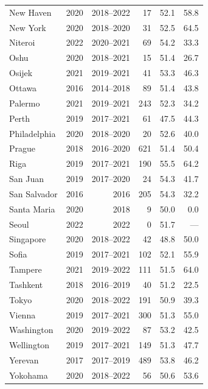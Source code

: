 \begin{longtable}{@{}lrrrrr@{}}
New Haven & 2020 & 2018–2022 & 17 & 52.1 & 58.8 \\
New York & 2020 & 2018–2020 & 31 & 52.5 & 64.5 \\
Niteroi & 2022 & 2020–2021 & 69 & 54.2 & 33.3 \\
Oshu & 2020 & 2018–2021 & 15 & 51.4 & 26.7 \\
Osijek & 2021 & 2019–2021 & 41 & 53.3 & 46.3 \\
Ottawa & 2016 & 2014–2018 & 89 & 51.4 & 43.8 \\
Palermo & 2021 & 2019–2021 & 243 & 52.3 & 34.2 \\
Perth & 2019 & 2017–2021 & 61 & 47.5 & 44.3 \\
Philadelphia & 2020 & 2018–2020 & 20 & 52.6 & 40.0 \\
Prague & 2018 & 2016–2020 & 621 & 51.4 & 50.4 \\
Riga & 2019 & 2017–2021 & 190 & 55.5 & 64.2 \\
San Juan & 2019 & 2017–2020 & 24 & 54.3 & 41.7 \\
San Salvador & 2016 & 2016 & 205 & 54.3 & 32.2 \\
Santa Maria & 2020 & 2018 & 9 & 50.0 & 0.0 \\
Seoul & 2022 & 2022 & 0 & 51.7 & — \\
Singapore & 2020 & 2018–2022 & 42 & 48.8 & 50.0 \\
Sofia & 2019 & 2017–2021 & 102 & 52.1 & 55.9 \\
Tampere & 2021 & 2019–2022 & 111 & 51.5 & 64.0 \\
Tashkent & 2018 & 2016–2019 & 40 & 51.2 & 22.5 \\
Tokyo & 2020 & 2018–2022 & 191 & 50.9 & 39.3 \\
Vienna & 2019 & 2017–2021 & 300 & 51.3 & 55.0 \\
Washington & 2020 & 2019–2022 & 87 & 53.2 & 42.5 \\
Wellington & 2019 & 2017–2021 & 149 & 51.3 & 47.7 \\
Yerevan & 2017 & 2017–2019 & 489 & 53.8 & 46.2 \\
Yokohama & 2020 & 2018–2022 & 56 & 50.6 & 53.6 \\
\end{longtable}

